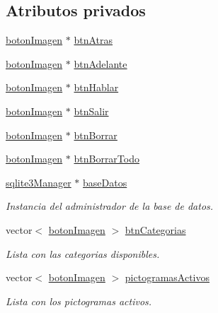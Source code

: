 \subsection*{Atributos privados}
\begin{DoxyCompactItemize}
\item 
\hyperlink{classboton_imagen}{boton\+Imagen} $\ast$ \hyperlink{classespacio_pictograma_ae17417de4e3122b89c29119a320888f0}{btn\+Atras}
\item 
\hyperlink{classboton_imagen}{boton\+Imagen} $\ast$ \hyperlink{classespacio_pictograma_a9157dd34f8f48cd755f721b288369dfe}{btn\+Adelante}
\item 
\hyperlink{classboton_imagen}{boton\+Imagen} $\ast$ \hyperlink{classespacio_pictograma_a739c7db68be68b07c10fe93b44a5a4d1}{btn\+Hablar}
\item 
\hyperlink{classboton_imagen}{boton\+Imagen} $\ast$ \hyperlink{classespacio_pictograma_ade5373849fab0cb55bc87bc4293e8c04}{btn\+Salir}
\item 
\hyperlink{classboton_imagen}{boton\+Imagen} $\ast$ \hyperlink{classespacio_pictograma_aa1f188f89952d7886f1d6f50f38b590f}{btn\+Borrar}
\item 
\hyperlink{classboton_imagen}{boton\+Imagen} $\ast$ \hyperlink{classespacio_pictograma_a669d076dad44b310f85b1f5dccf75568}{btn\+Borrar\+Todo}
\item 
\hyperlink{classsqlite3_manager}{sqlite3\+Manager} $\ast$ \hyperlink{classespacio_pictograma_a2e1fdcb75a25332576f897e77d1fe2de}{base\+Datos}
\begin{DoxyCompactList}\small\item\em Instancia del administrador de la base de datos. \end{DoxyCompactList}\item 
vector$<$ \hyperlink{classboton_imagen}{boton\+Imagen} $>$ \hyperlink{classespacio_pictograma_a1bee74237dc5c39e48be1f6773ca854d}{btn\+Categorias}
\begin{DoxyCompactList}\small\item\em Lista con las categorias disponibles. \end{DoxyCompactList}\item 
vector$<$ \hyperlink{classboton_imagen}{boton\+Imagen} $>$ \hyperlink{classespacio_pictograma_a7c0a60d23d55abbc5bb131fadf0210d4}{pictogramas\+Activos}
\begin{DoxyCompactList}\small\item\em Lista con los pictogramas activos. \end{DoxyCompactList}\item 

\end{DoxyCompactItemize}
